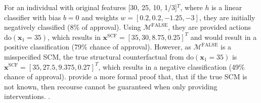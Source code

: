 For an individual with original features [30, 25, 10, 1/3]$^T$, where $h$ is a linear classifier with bias $b=0$ and weights $w=[0.2, 0.2, -1.25, -3]$, they are initially negatively classified (8\% of approval). Using $\mathcal{M}^{\text{FALSE}}$, they are provided actions $\text{do}(\boldsymbol{x}_1=35)$, which results in $\boldsymbol{x}^{\text{SCF}} = [35, 30, 8.75, 0.25]^T$ and would result in a positive classification (79\% chance of approval). However, as $\mathcal{M}^{\text{FALSE}}$ is a misspecified SCM, the true structural counterfactual from $\text{do}(\boldsymbol{x}_1=35)$ is $\boldsymbol{x}^{\text{SCF}} = [35, 27.5, 9.375, 0.27]^T$, which results in a negative classification (49\% chance of approval). \textcite{karimiAlgorithmicRecourseImperfect2020} provide a more formal proof that, that if the true SCM is not known, then recourse cannot be guaranteed when only providing interventions. .










